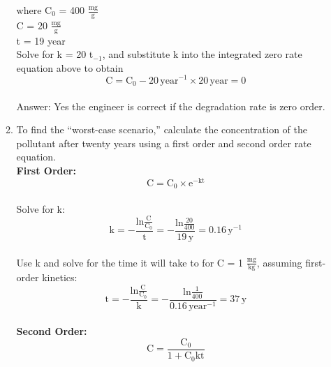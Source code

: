 \documentclass[12pt,letterpaper]{article}
\begin{document}
\begin{enumerate}
\begin{enumerate}
where C$_0$ = 400 $\mathrm{\frac{mg}{g}}$\\
C = 20 $\mathrm{\frac{mg}{g}}$\\
t = 19 year\\

Solve for k = 20 t$_{-1}$, and substitute k into the integrated zero rate equation above to obtain\\

\begin{equation*}
\mathrm{C = C_0 -20\, year^{-1}\times 20 \, year = 0}
\end{equation*}\\



Answer: Yes the engineer is correct if the degradation rate is zero order.

\item To find the ``worst-case scenario,'' calculate the concentration of the pollutant after twenty years using a first order and second order rate equation.\\

\textbf{First Order:}\\

\begin{equation*}
\mathrm{C = C_0\times e^{-kt}}
\end{equation*}\\

Solve for k:\\

\begin{equation*}
\mathrm{k = -\frac{ln\frac{C}{C_0}}{t} = -\frac{ln\frac{20}{400}}{19\, y} = 0.16 \, y^{-1}}
\end{equation*}\\

Use k and solve for the time it will take to for C = 1 $\mathrm{\frac{mg}{kg}}$, assuming first-order kinetics:\\

\begin{equation*}
\mathrm{t = -\frac{ln\frac{C}{C_0}}{k} = -\frac{ln\frac{1}{400}}{0.16\, year^{-1}} = 37 \, y}
\end{equation*}\\

\textbf{Second Order:}\\

\begin{equation*}
\mathrm{C = \frac{C_0}{1 + C_0kt}}
\end{equation*}\\


\end{enumerate}
\end{enumerate}
\end{document}
